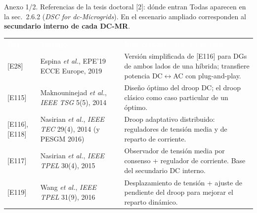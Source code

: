 \documentclass[aspectratio=169,10pt,t]{beamer}
\newcommand{\thead}{\rowcolor{usachO}}
\newcommand{\Th}[1]{\textcolor{white}{\textbf{#1}}}
\begin{document}
\begin{frame}{Anexo 1/2. Referencias de la tesis doctoral [2]: dónde entran}
  \scriptsize\renewcommand{\arraystretch}{1.15}
  Todas aparecen en la sec.\ 2.6.2 (\emph{DSC for dc-Microgrids}). En el escenario ampliado corresponden al \textbf{secundario interno de cada DC-MR}.\\[3pt]
  \begin{tabularx}{\textwidth}{@{}p{0.95cm}p{3.6cm}X@{}}
    \thead \Th{Ref.} & \Th{Trabajo} & \Th{Idea central / uso en la tesis} \\
    {[E28]} & Espina \emph{et al.}, EPE'19 ECCE Europe, 2019 & Versión simplificada de [E116] para DGs de ambos lados de una híbrida; transfiere potencia DC$\leftrightarrow$AC con plug-and-play. \\
    {[E115]} & Maknouninejad \emph{et al.}, \emph{IEEE TSG} 5(5), 2014 & Diseño óptimo del droop DC; el droop clásico como caso particular de un óptimo. \\
    {[E116], [E118]} & Nasirian \emph{et al.}, \emph{IEEE TEC} 29(4), 2014 (y PESGM 2016) & Droop adaptativo distribuido: reguladores de tensión media y de reparto de corriente. \\
    {[E117]} & Nasirian \emph{et al.}, \emph{IEEE TPEL} 30(4), 2015 & Observador de tensión media por consenso + regulador de corriente. Base del secundario DC interno. \\
    {[E119]} & Wang \emph{et al.}, \emph{IEEE TPEL} 31(9), 2016 & Desplazamiento de tensión + ajuste de pendiente del droop para mejorar el reparto dinámico. \\
  \end{tabularx}
\end{frame}
\end{document}
